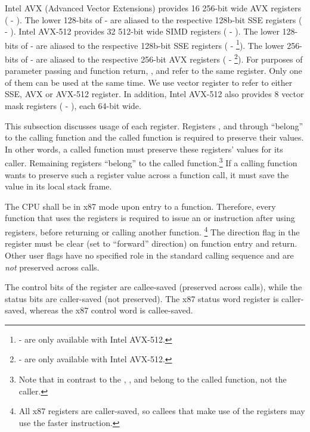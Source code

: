 Intel AVX (Advanced Vector Extensions) provides 16 256-bit wide AVX registers
( - ).  The lower 128-bits of  - 
are aliased to the respective 128b-bit SSE registers ( -
).  Intel AVX-512 provides 32 512-bit wide SIMD registers
( - ).  The lower 128-bits of  - 
are aliased to the respective 128b-bit SSE registers
( - \footnote{ - 
are only available with Intel AVX-512.}).
The lower 256-bits of  - 
are aliased to the respective 256-bit AVX registers
( - \footnote{ - 
are only available with Intel AVX-512.}).
For purposes of parameter passing
and function return, ,  and  refer to the
same register. Only one of them can be used at the same time.  We use
vector register to refer to either SSE, AVX or AVX-512 register.  In
addition, Intel AVX-512 also provides 8 vector mask registers (
- ), each 64-bit wide.

This subsection discusses usage of each register.  Registers \RBP, \RBX and
 through  ``belong'' to the calling function and the
called function is required to preserve their values.  In other words,
a called function must preserve these registers' values for its
caller.  Remaining registers ``belong'' to the called
function.\footnote{Note that in contrast to the \intelabi, \RDI,
  and \RSI belong to the called function, not the caller.}  If a
calling function wants to preserve such a register value across a
function call, it must save the value in its local stack frame.

The CPU shall be in x87 mode upon entry to a function.  Therefore,
every function that uses the \MMX registers is required to issue an
 or  instruction after using \MMX registers, before
returning or calling another function.  \footnote{All x87 registers
are caller-saved, so callees that make use of the \MMX registers may
use the faster  instruction.}  The direction flag  in the
 register must be clear (set to ``forward'' direction) on function
entry and return.  Other user flags have no specified role in the
standard calling sequence and are {\em not} preserved across calls.

The control bits of the  register are callee-saved
(preserved across calls), while the status bits are caller-saved (not
preserved).  The x87 status word register is caller-saved, whereas
the x87 control word is callee-saved.


